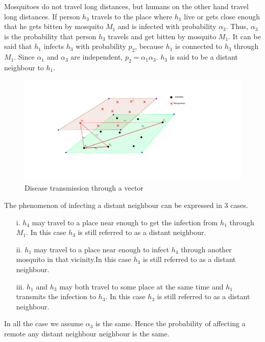 Mosquitoes do not travel long distances, but humans on the other hand travel long distances. If person $h_3$ travels to the place where $h_1$ live or gets close enough that he gets bitten by mosquito $M_1$ and is infected with probability $\alpha_3$. Thus, $\alpha_3$ is the probability that person $h_3$ travels and get bitten by mosquito $M_1$. It can be said that $h_1$ infects $h_3$ with probability $p_2$, because $h_1$ is connected to $h_3$ through $M_1$. Since $\alpha_1$ and  $\alpha_3$ are independent, $p_2 = \alpha_1 \alpha_3$. $h_3$ is said to be a distant neighbour to $h_1$.
\begin{figure}[h!]
\centering
\includegraphics[scale=0.6]{images/human_mosquito.png}
\caption{Disease transmission through a vector} \label{fig5}
\end{figure}
The phenomenon of infecting a distant neighbour can be expressed in 3 cases.
\begin{itemize}
\item[i.] $h_4$ may travel to a place near enough to get the infection from $h_1$ through $M_1$. In this case $h_3$ is still referred to as a distant neighbour.
\item[ii.] $ h_1$ may travel to a place near enough to infect $h_4$  through another mosquito in that vicinity.In this case $h_3$ is still referred to as a distant neighbour.
\item[iii.] $h_1$  and $h_3$ may both travel to some place at the same time and $h_1$ transmits the infection to $h_3$. In this case $h_3$ is still referred to as a distant neighbour.
\end{itemize}

In all the case we assume $\alpha_3$ is the same. Hence the probability of affecting a remote any distant neighbour neighbour is the same.

